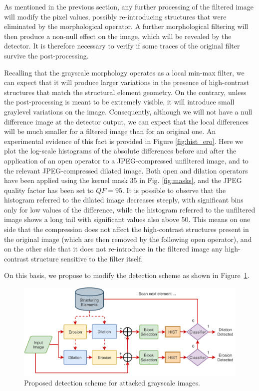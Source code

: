 \documentclass[review]{elsarticle}
\begin{document}
As mentioned in the previous section, any further processing of the filtered image will modify the pixel values, possibly re-introducing structures that were eliminated by the morphological operator. A further morphological filtering will then produce a non-null effect on the image, which will be revealed by the detector. It is therefore necessary to verify if some traces of the original filter survive the post-processing.

Recalling that the grayscale morphology operates as a local min-max filter, we can expect that it will produce larger variations in the presence of high-contrast structures that match the structural element geometry. On the contrary, unless the post-processing is meant to be extremely visible, it will introduce small graylevel variations on the image. Consequently, although we will not have a null difference image at the detector output, we can expect that the local differences will be much smaller for a filtered image than for an original one. An experimental evidence of this fact is provided in Figure \ref{fig:hist_ero}. Here we plot the log-scale histograms of the absolute differences before and after the application of an open operator to a JPEG-compressed unfiltered image, and to the relevant JPEG-compressed dilated image. Both open and dilation operators have been applied using the kernel mask $35$ in Fig. \ref{fig:masks}, and the JPEG quality factor has been set to $QF=95$. It is possible to observe that the histogram referred to the dilated image decreases steeply, with significant bins only for low values of the difference, while the histogram referred to the unfiltered image shows a long tail with significant values also above 50. This means on one side that the compression does not affect the high-contrast structures present in the original image (which are then removed by the following open operator), and on the other side that it does not re-introduce in the filtered image any high-contrast structure sensitive to the filter itself.

On this basis, we propose to modify the detection scheme as shown in Figure~\ref{fig:scheme_improved}.

\begin{figure}[!ht]
	\centering
	\includegraphics[width=\linewidth]{diagram2}
	\caption{Proposed detection scheme for attacked grayscale images.} 
	\label{fig:scheme_improved}
\end{figure}
\end{document}
